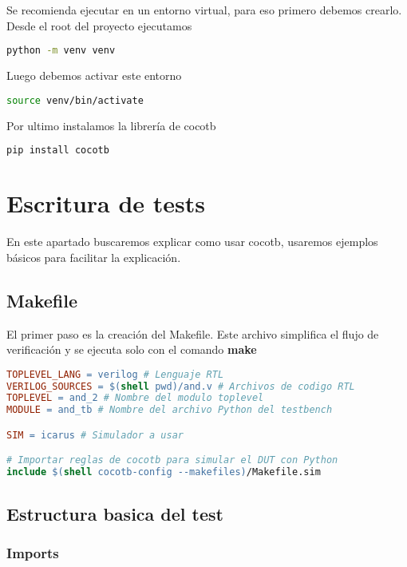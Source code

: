 \documentclass[a4paper,12pt]{article}
\newcommand{\todoo}[2][] {\smallskip \todo[inline, size=\small, color=green!40, #1]{#2}}
\begin{document}
Se recomienda ejecutar en un entorno virtual, para eso primero debemos crearlo. Desde el root del proyecto ejecutamos
\begin{lstlisting}[language=bash]
python -m venv venv
\end{lstlisting}

Luego debemos activar este entorno
\begin{lstlisting}[language=bash]
source venv/bin/activate
\end{lstlisting}

Por ultimo instalamos la librería de cocotb
\begin{lstlisting}[language=bash]
pip install cocotb
\end{lstlisting}

\todoo{cocotb verification}

\newpage

\section{Escritura de tests}
En este apartado buscaremos explicar como usar cocotb, usaremos ejemplos básicos para facilitar la explicación.

\subsection{Makefile}

El primer paso es la creación del Makefile. Este archivo simplifica el flujo de verificación y se ejecuta solo con el comando \textbf{make}

\begin{lstlisting}[language=make, caption=Makefile, frame=lines]
TOPLEVEL_LANG = verilog # Lenguaje RTL
VERILOG_SOURCES = $(shell pwd)/and.v # Archivos de codigo RTL
TOPLEVEL = and_2 # Nombre del modulo toplevel
MODULE = and_tb # Nombre del archivo Python del testbench

SIM = icarus # Simulador a usar

# Importar reglas de cocotb para simular el DUT con Python
include $(shell cocotb-config --makefiles)/Makefile.sim
\end{lstlisting}


\subsection{Estructura basica del test}

\subsubsection{Imports}
\end{document}
